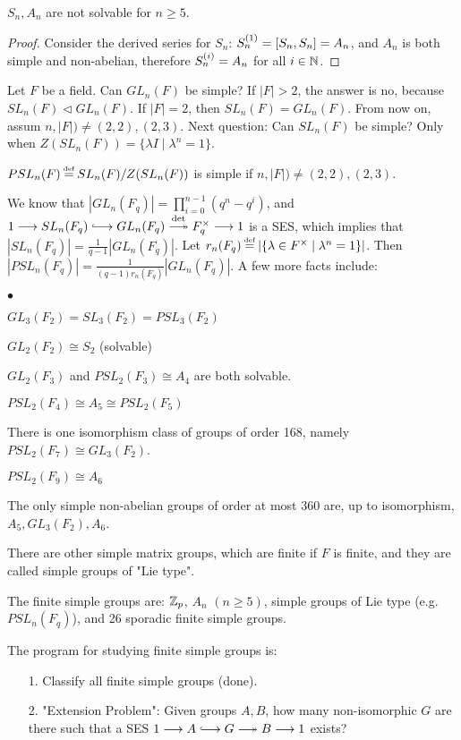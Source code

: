 \documentclass[11pt]{book}
\theoremstyle{definition}   \newtheorem{defn}[counter]{Definition} %
\newcommand\myeq{\mathrel{\overset{\makebox[0pt]{\mbox{\normalfont\tiny\sffamily \textrm{def}}}}{=}}}
\newcommand{\tl}{\triangleleft}   \newcommand{\sd}[1]{\rtimes_{#1}}   \newcommand{\x}{^{\times}}   \newcommand{\cyc}[1]{\begin{pmatrix} #1 \end{pmatrix}}
\newcommand{\hooklongrightarrow}{\lhook\joinrel\longrightarrow}   \newcommand{\twoheadlongrightarrow}{\relbar\joinrel\twoheadrightarrow}
\newcommand{\ses}[5]{1 \longrightarrow #1 \overset{#2}{\hooklongrightarrow} #3 \overset{#4}{\twoheadlongrightarrow} #5 \longrightarrow 1}
\newcommand{\vs}{\vspace{8pt}}
\numberwithin{counter}{chapter}
\begin{document}
\vs

\begin{corollary}
$S_n, A_n$ are not solvable for $n \geq 5$.
\end{corollary}

\begin{proof}
Consider the derived series for $S_n$: $S_n^{(1)} = [S_n,S_n] = A_n$, and $A_n$ is both simple and non-abelian, therefore $S_n^{(i)} = A_n$ for all $i \in \operatorname{\mathbb{N}}$.
\end{proof}

\vs

\begin{example}
Let $F$ be a field. Can $GL_n(F)$ be simple? If $|F| > 2$, the answer is no, because $SL_n(F) \tl GL_n(F)$. If $|F|= 2$, then $SL_n(F) = GL_n(F)$. From now on, assum $n,|F|) \ne (2,2), (2,3)$. Next question: Can $SL_n(F)$ be simple? Only when $Z(SL_n(F)) = \{ \lambda I \mid \lambda^n=1\}$.

\begin{theorem*}
$PSL_n(F) \myeq SL_n(F)/Z(SL_n(F))$ is simple if $n,|F|) \ne (2,2), (2,3)$.
\end{theorem*}

\vs

We know that $|GL_n(F_q)| = \prod_{i=0}^{n-1} (q^n-q^i)$, and $\ses{SL_n(F_q)}{}{GL_n(F_q)}{\det}{F_q\x}$ is a SES, which implies that $|SL_n(F_q)| = \frac{1}{q-1} |GL_n(F_q)|$. Let $r_n(F_q) \myeq |\{\lambda \in F\x \mid \lambda^n=1\}|$. Then $|PSL_n(F_q)| = \frac{1}{(q-1)r_n(F_q)} |GL_n(F_q)|$. A few more facts include:
	\begin{list}{$\bullet$}{}
	\item $GL_3(F_2) = SL_3(F_2) = PSL_3(F_2)$
	\item $GL_2(F_2) \cong S_2$ (solvable)
	\item $GL_2(F_3)$ and $PSL_2(F_3) \cong A_4$ are both solvable.
	\item $PSL_2(F_4) \cong A_5 \cong PSL_2(F_5)$
	\item There is one isomorphism class of groups of order 168, namely $PSL_2(F_7) \cong GL_3(F_2)$.
	\item $PSL_2(F_9) \cong A_6$
	\item The only simple non-abelian groups of order at most 360 are, up to isomorphism, $A_5, GL_3(F_2), A_6$.
	\item There are other simple matrix groups, which are finite if $F$ is finite, and they are called simple groups of "Lie type".
	\item The finite simple groups are: $\operatorname{\mathbb{Z}}_p$, $A_n$ $(n \geq 5)$, simple groups of Lie type (e.g. $PSL_n(F_q)$), and 26 sporadic finite simple groups.
	\end{list}

The program for studying finite simple groups is:
	\begin{enumerate}
	\item[1. ] Classify all finite simple groups (done).
	\item[2. ] "Extension Problem": Given groups $A,B$, how many non-isomorphic $G$ are there such that a SES $\ses{A}{}{G}{}{B}$ exists?
	\end{enumerate}
\end{example}
\end{document}
